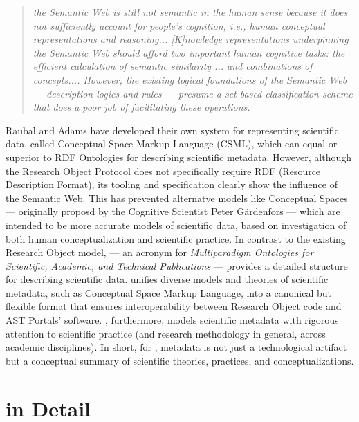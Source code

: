 \documentclass[11pt,letterpaper]{article}
\begin{document}
\begin{quote}{\textit{
 the Semantic Web is still not semantic in the 
 human sense because it does not sufficiently 
account for people's cognition, i.e., human conceptual 
representations and reasoning...  [K]nowledge representations 
underpinning the Semantic Web should
afford two important human cognitive tasks: 
the efficient calculation of semantic similarity ... 
and combinations of concepts.... However, 
the existing logical foundations of the Semantic
Web --- description logics and rules --- presume a set-based 
classification scheme that does a poor job of
facilitating these operations.}} 
\end{quote}

Raubal and Adams have developed their own system 
for representing scientific data, called Conceptual 
Space Markup Language (CSML), which can 
equal or superior to RDF Ontologies for describing 
scientific metadata.  However, 
although the Research Object Protocol 
does not specifically require RDF (Resource Description 
Format), its tooling and specification clearly 
show the influence of the Semantic Web.  
This has prevented alternatve models like 
Conceptual Spaces --- originally proposd 
by the Cognitive Scientist Peter G\"ardenfors 
--- which are intended to be more 
accurate models of scientific data, based on investigation 
of both human conceptualization and scientific practice. 
\p{} 
In contrast to the existing Research Object model, 
{\MOSAIC} --- an acronym for \textit{Multiparadigm 
Ontologies for Scientific, Academic, and Technical Publications} 
--- provides a detailed structure for 
describing scientific data.  
{\MOSAIC} unifies diverse models and theories of 
scientific metadata, such as Conceptual 
Space Markup Language, into a canonical but flexible format 
that ensures interoperability between Research Object code 
and AST Portals' software.  {\MOSAIC}, furthermore, 
models scientific metadata with rigorous attention 
to scientific practice (and research methodology 
in general, across academic disciplines).  In 
short, for {\MOSAIC}, metadata is not just a technological 
artifact but a conceptual summary of scientific theories, 
practices, and conceptualizations.  
\p{}
\section{{\lMOSAIC} in Detail}
\end{document}
